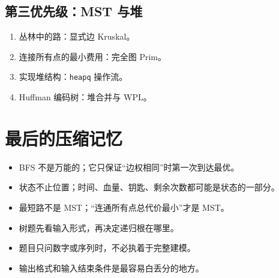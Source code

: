 \documentclass[10pt,a4paper,fontset=none]{ctexart}
\begin{document}
\subsection{第三优先级：MST 与堆}
\begin{enumerate}
  \item 丛林中的路：显式边 Kruskal。
  \item 连接所有点的最小费用：完全图 Prim。
  \item 实现堆结构：\texttt{heapq} 操作流。
  \item Huffman 编码树：堆合并与 WPL。
\end{enumerate}

\section{最后的压缩记忆}

\begin{focusbox}
\begin{itemize}
  \item BFS 不是万能的；它只保证“边权相同”时第一次到达最优。
  \item 状态不止位置；时间、血量、钥匙、剩余次数都可能是状态的一部分。
  \item 最短路不是 MST；“连通所有点总代价最小”才是 MST。
  \item 树题先看输入形式，再决定递归根在哪里。
  \item 题目只问数字或序列时，不必执着于完整建模。
  \item 输出格式和输入结束条件是最容易白丢分的地方。
\end{itemize}
\end{focusbox}
\end{document}
